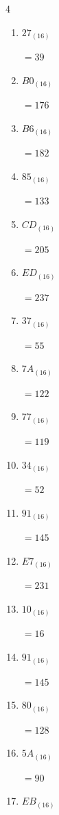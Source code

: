 \begin{multicols}{4}
\begin{enumerate}
  \item $27_{(16)}$

        $=39$

  \item $B0_{(16)}$

        $=176$

\columnbreak %

  \item $B6_{(16)}$

        $=182$

  \item $85_{(16)}$

        $=133$

  \item $CD_{(16)}$

        $=205$

  \item $ED_{(16)}$

        $=237$

  \item $37_{(16)}$

        $=55$

  \item $7A_{(16)}$

        $=122$

  \item $77_{(16)}$

        $=119$

  \item $34_{(16)}$

        $=52$

  \item $91_{(16)}$

        $=145$

  \item $E7_{(16)}$

        $=231$

  \item $10_{(16)}$

        $=16$

  \item $91_{(16)}$

        $=145$

  \item $80_{(16)}$

        $=128$

  \item $5A_{(16)}$

        $=90$

  \item $EB_{(16)}$


\end{enumerate}
\end{multicols}
